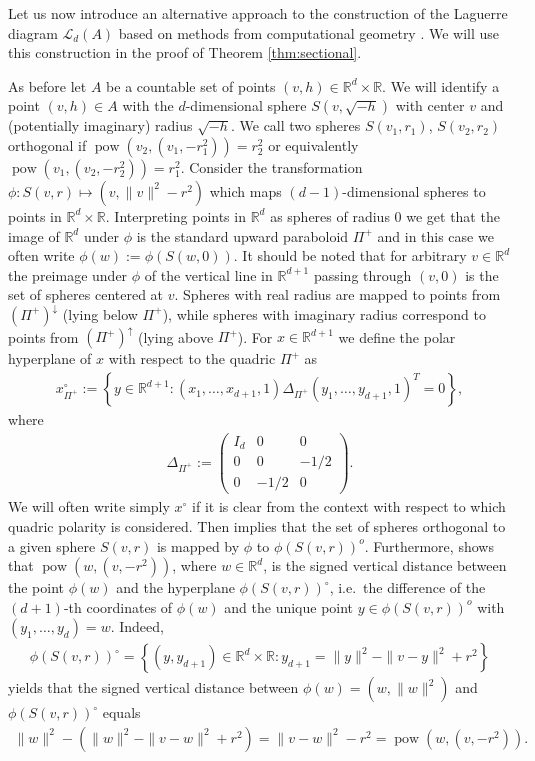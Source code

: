 \documentclass[11pt,a4paper]{article}
\theoremstyle{plain}
\theoremstyle{definition}
\theoremstyle{remark}
\def\RR{\mathbb{R}}
\def\cL{\mathcal{L}}
\newcommand{\pow}{\mathop{\mathrm{pow}}\nolimits}
\begin{document}
Let us now introduce an alternative approach to the construction of the Laguerre diagram $\cL_d(A)$ based on methods from computational geometry \cite{BY98}. We will use this construction in the proof of Theorem \ref{thm:sectional}. 

As before let $A$ be a countable set of points $(v,h) \in \RR^d \times \RR$. We will identify a point $(v,h) \in A$ with the $d$-dimensional sphere $S(v,\sqrt{-h})$ with center $v$ and (potentially imaginary) radius $\sqrt{-h}$. We call two spheres $S(v_1,r_1)$, $S(v_2,r_2)$ orthogonal if $\pow(v_2,(v_1,-r_1^2))=r_2^2$ or equivalently $\pow(v_1,(v_2,-r_2^2))=r_1^2$. Consider the transformation $\phi \colon S(v,r) \mapsto (v, \|v\|^2 - r^2)$ which maps $(d-1)$-dimensional spheres to points in $\RR^d \times \RR$. Interpreting points in $\RR^d$ as spheres of radius $0$ we get that the image of $\RR^d$ under $\phi$ is the standard upward paraboloid $\Pi^+$ and in this case we often write $\phi(w):=\phi(S(w,0))$. It should be noted that for arbitrary $v\in\RR^d$ the preimage under $\phi$ of the vertical line in $\RR^{d+1}$ passing through $(v,0)$ is the set of spheres centered at $v$. Spheres with real radius are mapped to points from $(\Pi^+)^{\downarrow}$ (lying below $\Pi^+$), while spheres with imaginary radius correspond to points from $(\Pi^+)^{\uparrow}$ (lying above $\Pi^+$). For $x \in \RR^{d+1}$ we define the polar hyperplane of $x$ with respect to the quadric $\Pi^+$ as
\begin{align*}
    x^\circ_{\Pi^+} := \left\{y \in \RR^{d+1}: (x_1,\dots , x_{d+1}, 1) \Delta_{\Pi^+} (y_1, \dots, y_{d+1}, 1)^T = 0\right\}, 
\end{align*}
where
\begin{align*}
    \Delta_{\Pi^+} := 
        \begin{pmatrix}
        I_d & 0 & 0\\
        0 & 0 & -1/2\\
        0 & -1/2 & 0
        \end{pmatrix}.
\end{align*}
We will often write simply $x^{\circ}$ if it is clear from the context with respect to which quadric polarity is considered. 
Then \cite[Lemma~17.2.1]{BY98} implies that the set of spheres orthogonal to a given sphere $S(v,r)$ is mapped by $\phi$ to $\phi(S(v,r))^o$. Furthermore, \cite[Lemma~17.2.3]{BY98} shows that $\pow(w,(v,-r^2))$, where $w\in \RR^d$, is the signed vertical distance between the point $\phi(w)$ and the hyperplane $\phi(S(v,r))^\circ$, i.e.\ the difference of the $(d+1)$-th coordinates of $\phi(w)$ and the unique point $y\in\phi(S(v,r))^o$ with $(y_1,\dots,y_d)=w$. Indeed,
\begin{align*}
    \phi\left(S\left(v,r\right)\right)^\circ=\left\{(y,y_{d+1}) \in \RR^d \times \RR: y_{d+1}=\| y \|^2 -\| v-y \|^2 +r^2\right\}
\end{align*}
yields that the signed vertical distance between $\phi(w)=(w,\|w\|^2)$ and $\phi(S(v,r))^\circ$ equals
\begin{align*}
    \|w\|^2 - (\| w \|^2 -\| v-w \|^2 +r^2) = \| v-w \|^2 -r^2 = \pow(w,(v,-r^2)).
\end{align*}
\end{document}
